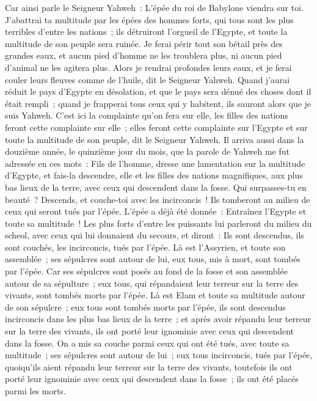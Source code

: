 \begin{multicols}{2}
Car ainsi parle le Seigneur Yahweh~: L'épée du roi de Babylone viendra sur toi.
J'abattrai ta multitude par les épées des hommes forts, qui tous sont les plus terribles d'entre les nations~; ils détruiront l'orgueil de l'Egypte, et toute la multitude de son peuple sera ruinée.
Je ferai périr tout son bétail près des grandes eaux, et aucun pied d'homme ne les troublera plus, ni aucun pied d'animal ne les agitera plus.
Alors je rendrai profondes leurs eaux, et je ferai couler leurs fleuves comme de l'huile, dit le Seigneur Yahweh.
Quand j'aurai réduit le pays d'Egypte en désolation, et que le pays sera dénué des choses dont il était rempli~; quand je frapperai tous ceux qui y habitent, ils sauront alors que je suis Yahweh.
C'est ici la complainte qu'on fera sur elle, les filles des nations feront cette complainte sur elle~; elles feront cette complainte sur l'Egypte et sur toute la multitude de son peuple, dit le Seigneur Yahweh.
Il arriva aussi dans la douzième année, le quinzième jour du mois, que la parole de Yahweh me fut adressée en ces mots~:
Fils de l'homme, dresse une lamentation sur la multitude d'Egypte, et fais-la descendre, elle et les filles des nations magnifiques, aux plus bas lieux de la terre, avec ceux qui descendent dans la fosse.
Qui surpasses-tu en beauté~? Descends, et couche-toi avec les incirconcis~!
Ils tomberont au milieu de ceux qui seront tués par l'épée. L'épée a déjà été donnée~: Entraînez l'Egypte et toute sa multitude~!
Les plus forts d'entre les puissants lui parleront du milieu du scheol, avec ceux qui lui donnaient du secours, et diront~: Ils sont descendus, ils sont couchés, les incirconcis, tués par l'épée.
Là est l'Assyrien, et toute son assemblée~; ses sépulcres sont autour de lui, eux tous, mis à mort, sont tombés par l'épée.
Car ses sépulcres sont posés au fond de la fosse et son assemblée autour de sa sépulture~; eux tous, qui répandaient leur terreur sur la terre des vivants, sont tombés morts par l'épée.
Là est Elam et toute sa multitude autour de son sépulcre~; eux tous sont tombés morts par l'épée, ils sont descendus incirconcis dans les plus bas lieux de la terre~; et après avoir répandu leur terreur sur la terre des vivants, ils ont porté leur ignominie avec ceux qui descendent dans la fosse.
On a mis sa couche parmi ceux qui ont été tués, avec toute sa multitude~; ses sépulcres sont autour de lui~; eux tous incirconcis, tués par l'épée, quoiqu'ils aient répandu leur terreur sur la terre des vivants, toutefois ils ont porté leur ignominie avec ceux qui descendent dans la fosse~; ils ont été placés parmi les morts.

\end{multicols}
